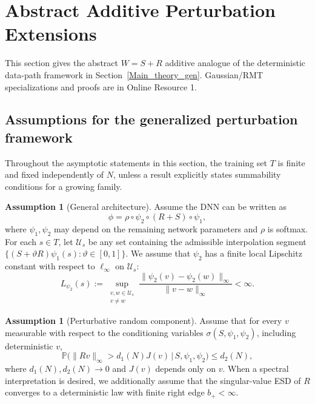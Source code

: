\documentclass[11pt]{article}
\theoremstyle{plain}
\theoremstyle{definition}
\newtheorem{assumption}[thm]{Assumption}
\theoremstyle{remark}
\newcommand{\PP}{\mathbb{P}}
\newcommand{\1}{\mathbf{1}}
\begin{document}
\FloatBarrier
\section{Abstract Additive Perturbation Extensions}
\label{sec:abstract_additive_extensions}

This section gives the abstract \(W=S+R\) additive analogue of the deterministic data-path framework in Section~\ref{Main_theory_gen}. Gaussian/RMT specializations and proofs are in Online Resource 1.

\subsection{Assumptions for the generalized perturbation framework}
\label{gen_ass_for_R}

Throughout the asymptotic statements in this section, the training set \(T\) is finite and fixed independently of \(N\), unless a result explicitly states summability conditions for a growing family.

\begin{assumption}[General architecture]
\label{as4}
Assume the DNN can be written as
\[
\phi=\rho\circ \psi_2\circ (R+S)\circ \psi_1,
\]
where \(\psi_1,\psi_2\) may depend on the remaining network parameters and \(\rho\) is softmax. For each \(s\in T\), let \(\mathcal U_s\) be any set containing the admissible interpolation segment \(\{(S+\vartheta R)\psi_1(s):\vartheta\in[0,1]\}\). We assume that \(\psi_2\) has a finite local Lipschitz constant with respect to \(\ell_\infty\) on \(\mathcal U_s\):
\[
L_{\psi_2}(s)
:=
\sup_{\substack{v,w\in\mathcal U_s\\ v\neq w}}
\frac{\|\psi_2(v)-\psi_2(w)\|_{\infty}}{\|v-w\|_{\infty}}
<\infty.
\]
\end{assumption}

\begin{assumption}[Perturbative random component]
\label{as5}
Assume that for every \(v\) measurable with respect to the conditioning variables \(\sigma(S,\psi_1,\psi_2)\), including deterministic \(v\),
\begin{equation}
\label{eq:general_perturb_assumption}
\PP\Big(\|Rv\|_{\infty}>d_1(N)J(v)\,\Big|\,S,\psi_1,\psi_2\Big)\le d_2(N),
\end{equation}
where \(d_1(N),d_2(N)\to0\) and \(J(v)\) depends only on \(v\). When a spectral interpretation is desired, we additionally assume that the singular-value ESD of \(R\) converges to a deterministic law with finite right edge \(b_+<\infty\).
\end{assumption}
\end{document}
